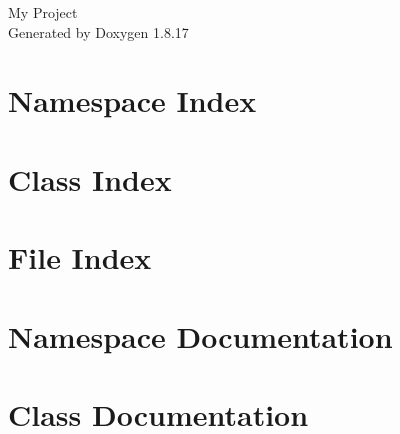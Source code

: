 \let\mypdfximage\pdfximage\def\pdfximage{\immediate\mypdfximage}\documentclass[twoside]{book}
\newcommand{\+}{\discretionary{\mbox{\scriptsize$\hookleftarrow$}}{}{}}
\newcommand{\clearemptydoublepage}{%
  \newpage{\pagestyle{empty}\cleardoublepage}%
}
\begin{document}
\hypersetup{pageanchor=false,
             bookmarksnumbered=true,
             pdfencoding=unicode
            }
\begin{titlepage}
\vspace*{7cm}
\begin{center}%
{\Large My Project }\\
\vspace*{1cm}
{\large Generated by Doxygen 1.8.17}\\
\end{center}
\end{titlepage}
\clearemptydoublepage
{}
\tableofcontents
\clearemptydoublepage
{}
\hypersetup{pageanchor=true}

\chapter{Namespace Index}

\chapter{Class Index}

\chapter{File Index}

\chapter{Namespace Documentation}






\chapter{Class Documentation}

























\end{document}
